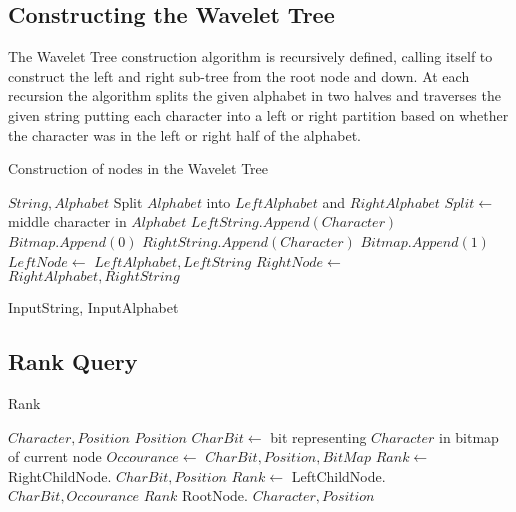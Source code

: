 \subsection{Constructing the Wavelet Tree}
\label{sec:nodeconstruction}
The Wavelet Tree construction algorithm is recursively defined, calling itself to construct the left and right sub-tree from the root node and down. At each recursion the algorithm splits the given alphabet in two halves and traverses the given string putting each character into a left or right partition based on whether the character was in the left or right half of the alphabet.

\begin{algorithm}
\caption{Construction of nodes in the Wavelet Tree}
\label{alg:ConstructNode}
\begin{algorithmic}
 {$String, Alphabet$}
	\State \Return
\EndIf
\State Split $Alphabet$ into $LeftAlphabet$ and $RightAlphabet$
\State $Split \gets$ middle character in $Alphabet$
		\State $LeftString.Append(Character)$
		\State $Bitmap.Append(0)$
	\Else
		\State $RightString.Append(Character)$
		\State $Bitmap.Append(1)$
	\EndIf
\EndFor
\State $LeftNode \gets$  {$LeftAlphabet, LeftString$}
\State $RightNode \gets$  {$RightAlphabet, RightString$}
\EndFunction

\State {} {InputString, InputAlphabet}
\end{algorithmic}
\end{algorithm}

\subsection{Rank Query}
\begin{algorithm}
\caption{Rank}
\label{alg:rank}
\begin{algorithmic} 
 {$Character, Position$}
\State \Return $Position$
\EndIf
\State $CharBit \gets$ bit representing $Character$ in bitmap of current node
\State $Occourance \gets$  {$CharBit, Position, BitMap$}
	\State $Rank \gets$ RightChildNode. {$CharBit, Position$}
\Else
	\State $Rank \gets$ LeftChildNode. {$CharBit, Occourance$}
\EndIf
\State \Return $Rank$ 
\EndFunction
\State RootNode. {$Character, Position$}
\end{algorithmic}
\end{algorithm}

